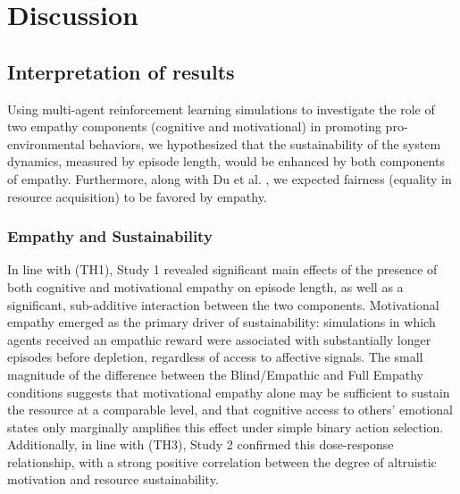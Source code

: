 \section{Discussion}
\subsection{Interpretation of results}

Using multi-agent reinforcement learning simulations to investigate the role of two empathy components (cognitive and motivational) in promoting pro-environmental behaviors, we hypothesized that the sustainability of the system dynamics, measured by episode length, would be enhanced by both components of empathy. Furthermore, along with Du et al. \cite{du_2024}, we expected fairness (equality in resource acquisition) to be favored by empathy.

\subsubsection{Empathy and Sustainability}
In line with (TH1), Study 1 revealed significant main effects of the presence of both cognitive and motivational empathy on episode length, as well as a significant, sub-additive interaction between the two components. Motivational empathy emerged as the primary driver of sustainability: simulations in which agents received an empathic reward were associated with substantially longer episodes before depletion, regardless of access to affective signals. The small magnitude of the difference between the Blind/Empathic and Full Empathy conditions suggests that motivational empathy alone may be sufficient to sustain the resource at a comparable level, and that cognitive access to others' emotional states only marginally amplifies this effect under simple binary action selection. Additionally, in line with (TH3), Study 2 confirmed this dose-response relationship, with a strong positive correlation between the degree of altruistic motivation and resource sustainability.

